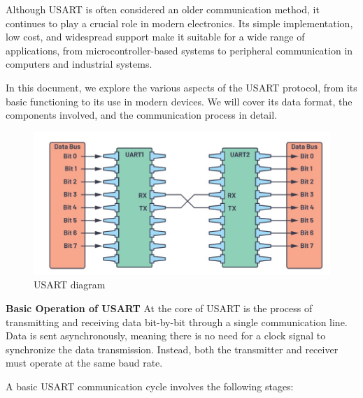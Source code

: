 \documentclass{article}
\numberwithin{equation}{section}
\numberwithin{figure}{section}
\numberwithin{table}{section}
\begin{document}
Although USART is often considered an older communication method, it continues to play a crucial role in modern electronics. Its simple implementation, low cost, and widespread support make it suitable for a wide range of applications, from microcontroller-based systems to peripheral communication in computers and industrial systems.

In this document, we explore the various aspects of the USART protocol, from its basic functioning to its use in modern devices. We will cover its data format, the components involved, and the communication process in detail.\cite{usart}
\begin{figure}[htbp]
    \includegraphics[width=0.8\linewidth]{WhatsApp Image 2024-12-02 at 2.04.51 PM.jpeg}
    \centering
    \caption{USART diagram}
    \label{fig:fig7}
\end{figure}


\textbf{Basic Operation of USART}
At the core of USART is the process of transmitting and receiving data bit-by-bit through a single communication line. Data is sent asynchronously, meaning there is no need for a clock signal to synchronize the data transmission. Instead, both the transmitter and receiver must operate at the same baud rate.

A basic USART communication cycle involves the following stages:
\end{document}
